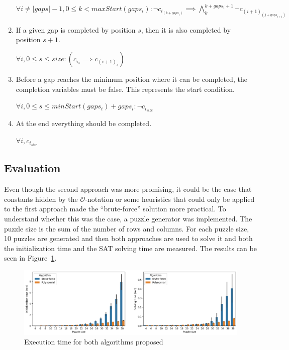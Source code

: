 \documentclass[12pt]{article}
\begin{document}
\begin{enumerate}
  \begin{center}
    $\forall i \ne |gaps|-1, 0 \le k < maxStart(gaps_i): \neg c_i_{(k+gaps_i)} \implies \bigwedge_k^{k+gaps_i+1} \neg c_{(i+1)}_{(j + gaps_{i+1})}$
  \end{center}

  \item If a given gap is completed by position $s$, then it is also completed by position $s+1$.
  \begin{center}
    $\forall i, 0 \le s \le size: (c_i_s \implies c_{(i+1)}_s) $
  \end{center}

  \item Before a gap reaches the minimum position where it can be completed, the completion variables must be false. This represents the start condition.
  \begin{center}
    $\forall i, 0 \le s \le minStart(gaps_i)+gaps_i: \neg c_i_{size}$
  \end{center}

  \item At the end everything should be completed.

  \begin{center}
    $\forall i, c_i_{size}$
  \end{center}
\end{enumerate}

\subsection*{Evaluation}

Even though the second approach was more promising, it could be the case that constants hidden by the $\mathcal{O}$-notation or some heuristics that could only be applied to the first approach made the ``brute-force'' solution more practical.
To understand whether this was the case, a puzzle generator was implemented.
The puzzle size is the sum of the number of rows and columns.
For each puzzle size, 10 puzzles are generated and then both approaches are used to solve it and both the initialization time and the SAT solving time are measured.
The results can be seen in Figure~\ref{fig:bench}. %

\begin{figure}[H]
  \includegraphics[scale=0.5]{bench.png}
  \centering
  \caption{Execution time for both algorithms proposed}
  \label{fig:bench}
\end{figure}
\end{document}
